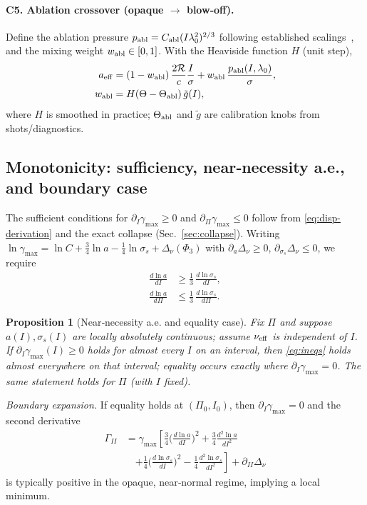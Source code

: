 \documentclass[aps,pre,twocolumn,showpacs,superscriptaddress]{revtex4-2}
\newtheorem{proposition}[theorem]{Proposition}
\theoremstyle{definition}
\begin{document}
\paragraph{C5. Ablation crossover (opaque $\to$ blow‑off).}
Define the ablation pressure $p_{\rm abl}=C_{\rm abl}(I\lambda_0^2)^{2/3}$ following established scalings~\cite{Fabbro1985PhysFluids,Batani2003PRE,Swift2011JAP,Schmitt2023PoP_Wavelength}, and the mixing weight $w_{\rm abl}\in[0,1]$. With the Heaviside function $H$ (unit step),
\begin{align}\label{eq:abl}
a_{\rm eff}&=(1-w_{\rm abl})\,\frac{2\mathcal{R}}{c}\frac{I}{\sigma}+w_{\rm abl}\,\frac{p_{\rm abl}(I,\lambda_0)}{\sigma},\nonumber\\
w_{\rm abl}&=H(\Theta-\Theta_{\rm abl})\,\tilde g(I),
\end{align}
where $H$ is smoothed in practice; $\Theta_{\rm abl}$ and $\tilde g$ are calibration knobs from shots/diagnostics.

\subsection{Monotonicity: sufficiency, near‑necessity a.e., and boundary case}\label{subsec:mono}

The sufficient conditions for $\partial_I\gamma_{\max}\ge 0$ and $\partial_\Pi\gamma_{\max}\le 0$ follow from \eqref{eq:disp-derivation} and the exact collapse (Sec.~\ref{sec:collapse}). Writing $\ln\gamma_{\max}=\ln C+\tfrac{3}{4}\ln a - \tfrac{1}{4}\ln \sigma_s + \Delta_\nu(\Phi_3)$ with $\partial_a\Delta_\nu\ge0$, $\partial_{\sigma_s}\Delta_\nu\le0$, we require
\begin{align}\label{eq:ineqs}
\frac{d\ln a}{dI} &\ge \tfrac{1}{3}\,\frac{d\ln \sigma_s}{dI},\\
\frac{d\ln a}{d\Pi} &\le \tfrac{1}{3}\,\frac{d\ln \sigma_s}{d\Pi}.
\end{align}

\begin{proposition}[Near‑necessity a.e. and equality case]\label{prop:nearn}
Fix $\Pi$ and suppose $a(I),\sigma_s(I)$ are locally absolutely continuous; assume $\nu_{\rm eff}$ is independent of $I$. If $\partial_I\gamma_{\max}(I)\ge 0$ holds for almost every $I$ on an interval, then \eqref{eq:ineqs} holds almost everywhere on that interval; equality occurs exactly where $\partial_I\gamma_{\max}=0$. The same statement holds for $\Pi$ (with $I$ fixed). 
\end{proposition}

\noindent\emph{Boundary expansion.} If equality holds at $(\Pi_0,I_0)$, then $\partial_I\gamma_{\max}=0$ and the second derivative
\begin{align}
\Gamma_{II}
&=\gamma_{\max}\!\left[\frac{3}{4}\Big(\frac{d\ln a}{dI}\Big)^2+\frac{3}{4}\frac{d^2\ln a}{dI^2}\right.\nonumber\\
&\quad\left.+\frac{1}{4}\Big(\frac{d\ln \sigma_s}{dI}\Big)^2-\frac{1}{4}\frac{d^2\ln \sigma_s}{dI^2}\right]+\partial_{II}\Delta_\nu \nonumber
\end{align}
is typically positive in the opaque, near‑normal regime, implying a local minimum.
\end{document}
